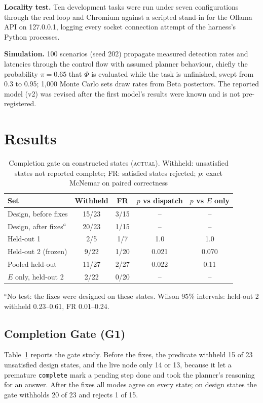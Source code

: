 \documentclass[conference]{IEEEtran}
\newcommand{\status}[1]{\textsc{#1}}
\begin{document}
\textbf{Locality test.} Ten development tasks were run under seven configurations through the real loop and Chromium against a scripted stand-in for the Ollama API on 127.0.0.1, logging every socket connection attempt of the harness's Python processes.

\textbf{Simulation.} 100 scenarios (seed 202) propagate measured detection rates and latencies through the control flow with assumed planner behaviour, chiefly the probability $\pi=0.65$ that $\Phi$ is evaluated while the task is unfinished, swept from 0.3 to 0.95; 1{,}000 Monte Carlo sets draw rates from Beta posteriors. The reported model (v2) was revised after the first model's results were known and is not pre-registered.

\section{Results}

\begin{table}[t]
\centering
\caption{Completion gate on constructed states (\status{actual}). Withheld: unsatisfied states not reported complete; FR: satisfied states rejected; $p$: exact McNemar on paired correctness}
\label{tab:gate}
\footnotesize
\setlength{\tabcolsep}{3pt}
\begin{tabular}{@{}lcccc@{}}
\toprule
Set & Withheld & FR & $p$ vs dispatch & $p$ vs $E$ only\\
\midrule
Design, before fixes & 15/23 & 3/15 & -- & --\\
Design, after fixes$^{a}$ & 20/23 & 1/15 & -- & --\\
Held-out 1 & 2/5 & 1/7 & 1.0 & 1.0\\
Held-out 2 (frozen) & 9/22 & 1/20 & 0.021 & 0.070\\
Pooled held-out & 11/27 & 2/27 & 0.022 & 0.11\\
$E$ only, held-out 2 & 2/22 & 0/20 & -- & --\\
\bottomrule
\end{tabular}

\vspace{2pt}
\raggedright\scriptsize $^{a}$No test: the fixes were designed on these states. Wilson 95\% intervals: held-out 2 withheld 0.23--0.61, FR 0.01--0.24.
\end{table}

\subsection{Completion Gate (G1)}
Table~\ref{tab:gate} reports the gate study. Before the fixes, the predicate withheld 15 of 23 unsatisfied design states, and the live node only 14 or 13, because it let a premature \texttt{complete} mark a pending step done and took the planner's reasoning for an answer. After the fixes all modes agree on every state; on design states the gate withholds 20 of 23 and rejects 1 of 15.
\end{document}

